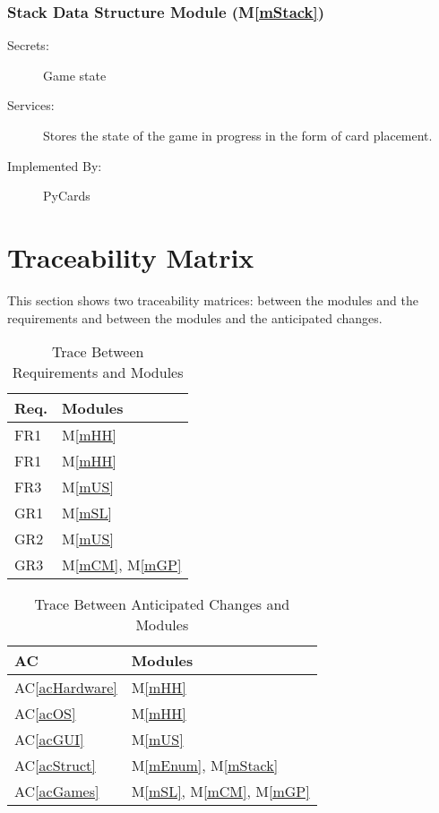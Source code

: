 \documentclass[12pt, titlepage]{article}
\newcommand{\acref}[1]{AC\ref{#1}}
\newcommand{\mref}[1]{M\ref{#1}}
\begin{document}
	\subsubsection{Stack Data Structure Module (\mref{mStack})}
	\begin{description}
		\item[Secrets:]Game state
		\item[Services:]Stores the state of the game in progress in the form of 
		card placement.
		\item[Implemented By:] PyCards
	\end{description}
	
	
	
	\section{Traceability Matrix} \label{SecTM}
	This section shows two traceability matrices: between the modules and the
	requirements and between the modules and the anticipated changes.
	\begin{table}[H]
		\centering
		\begin{tabular}{p{} p{}}
			\toprule
			\textbf{Req.} & \textbf{Modules}\\
			\midrule
			FR1 & \mref{mHH}\\
			FR1 & \mref{mHH}\\
			FR3 & \mref{mUS}\\
			GR1 & \mref{mSL}\\
			GR2 & \mref{mUS}\\
			GR3 & \mref{mCM}, \mref{mGP}\\
			\bottomrule
		\end{tabular}
		\caption{Trace Between Requirements and Modules}
		\label{TblRT}
	\end{table}
	\begin{table}[H]
		\centering
		\begin{tabular}{p{} p{}}
			\toprule
			\textbf{AC} & \textbf{Modules}\\
			\midrule
			\acref{acHardware} & \mref{mHH}\\
			\acref{acOS} & \mref{mHH}\\
			\acref{acGUI} & \mref{mUS}\\
			\acref{acStruct} & \mref{mEnum}, \mref{mStack}\\
			\acref{acGames} & \mref{mSL}, \mref{mCM}, \mref{mGP}\\
			\bottomrule
		\end{tabular}
		\caption{Trace Between Anticipated Changes and Modules}
		\label{TblACT}
	\end{table}
\end{document}
